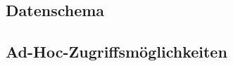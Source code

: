 \subsection{Datenschema}\label{hbase_datenschema}
\subsection{Ad-Hoc-Zugriffsmöglichkeiten}\label{hbase_adhoc}